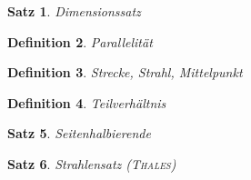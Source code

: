 \documentclass[%
a4paper,
10pt,           %
]
{scrartcl}
\theoremstyle{plain}
\newtheorem{mydef}{Definition}[section]
\theoremstyle{plain}
\newtheorem{mysatz}[mydef]{Satz}
\theoremstyle{plain}
\theoremstyle{plain}
\theoremstyle{plain}
\begin{document}
\begin{mysatz}
    Dimensionssatz
\end{mysatz}

\begin{mydef}
    Parallelität
\end{mydef}

\begin{mydef}
    Strecke, Strahl, Mittelpunkt
\end{mydef}

\begin{mydef}
    Teilverhältnis
\end{mydef}

\begin{mysatz}
    Seitenhalbierende
\end{mysatz}

\begin{mysatz}
    Strahlensatz (\textsc{Thales})
\end{mysatz}

\end{document}
